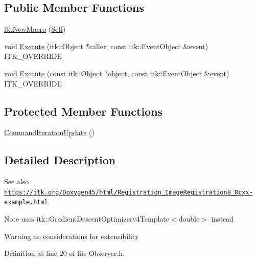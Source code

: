 \subsection*{Public Member Functions}
\begin{DoxyCompactItemize}
\item 
\hyperlink{class_command_iteration_update_a45a63d6e43a42eabd6adb27b1309c7a1}{itk\+New\+Macro} (\hyperlink{class_command_iteration_update_a82da0970ef8c14141f85f3465f08242e}{Self})
\item 
void \hyperlink{class_command_iteration_update_a9283ff36a470e597ea27e73a557d7c5f}{Execute} (itk\+::\+Object $\ast$caller, const itk\+::\+Event\+Object \&event) I\+T\+K\+\_\+\+O\+V\+E\+R\+R\+I\+DE
\item 
void \hyperlink{class_command_iteration_update_acb3a3b59afa764cf1b6d73190c33e6cb}{Execute} (const itk\+::\+Object $\ast$object, const itk\+::\+Event\+Object \&event) I\+T\+K\+\_\+\+O\+V\+E\+R\+R\+I\+DE
\end{DoxyCompactItemize}
\subsection*{Protected Member Functions}
\begin{DoxyCompactItemize}
\item 
\hyperlink{class_command_iteration_update_a3b6dc4b6e947779a656ce69152377a70}{Command\+Iteration\+Update} ()
\end{DoxyCompactItemize}


\subsection{Detailed Description}
\begin{DoxySeeAlso}{See also}
\href{https://itk.org/Doxygen45/html/Registration_2ImageRegistration8_8cxx-example.html}{\tt https\+://itk.\+org/\+Doxygen45/html/\+Registration\+\_\+Image\+Registration8\+\_\+8cxx-\/example.\+html} 
\end{DoxySeeAlso}
\begin{DoxyNote}{Note}
uses itk\+::\+Gradient\+Descent\+Optimizerv4\+Template$<$double$>$ instead 
\end{DoxyNote}
\begin{DoxyWarning}{Warning}
no considerations for extensibility 
\end{DoxyWarning}


Definition at line 20 of file Observer.\+h.



